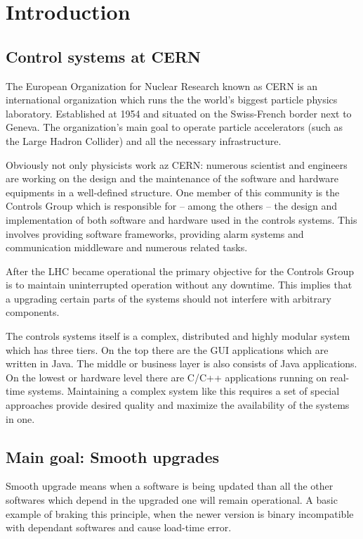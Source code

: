 \chapter{Introduction}


\section{Control systems at CERN}

The European Organization for Nuclear Research known as CERN is an international
organization which runs the the world's biggest particle physics laboratory.
Established at 1954 and situated on the Swiss-French border next to Geneva. The
organization's main goal to operate particle accelerators (such as the Large
Hadron Collider) and all the necessary infrastructure.

Obviously not only physicists work az CERN: numerous scientist and engineers are
working on the design and the maintenance of the software and hardware
equipments in a well-defined structure. One member of this community is the
Controls Group which is responsible for -- among the others -- the design and
implementation of both software and hardware used in the controls systems. This
involves providing software frameworks, providing alarm systems and
communication middleware and numerous related tasks.

After the LHC became operational the  primary objective for the Controls Group
is to maintain uninterrupted operation without any downtime. This implies that a
upgrading certain parts of the systems should not interfere with arbitrary
components.

The controls systems itself is a complex, distributed and highly modular system
which has three tiers. On the top there are the GUI applications which are
written in Java. The middle or business layer is also consists of Java
applications. On the lowest or hardware level there are C/C++ applications
running on real-time systems. Maintaining a complex system like this requires a
set of special approaches provide desired quality and maximize the availability
of the systems in one.

\section{Main goal: Smooth upgrades}
Smooth upgrade means when a software is being updated than all the other
softwares which depend in the upgraded one will remain operational. A basic
example of braking this principle, when the newer version is binary
incompatible with dependant softwares and cause load-time error.


